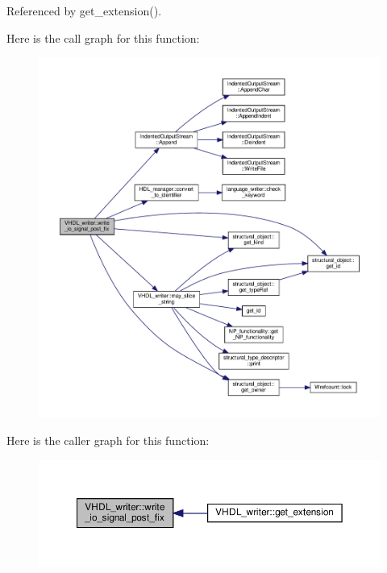 Referenced by get\+\_\+extension().

Here is the call graph for this function\+:
\nopagebreak
\begin{figure}[H]
\begin{center}
\leavevmode
\includegraphics[width=350pt]{d0/d0c/structVHDL__writer_ad21dd69e82fa37e50df3660cd177da3c_cgraph}
\end{center}
\end{figure}
Here is the caller graph for this function\+:
\nopagebreak
\begin{figure}[H]
\begin{center}
\leavevmode
\includegraphics[width=350pt]{d0/d0c/structVHDL__writer_ad21dd69e82fa37e50df3660cd177da3c_icgraph}
\end{center}
\end{figure}
\mbox{\label{structVHDL__writer_ab617f377af475bddff6b07f327f8b058}} 
